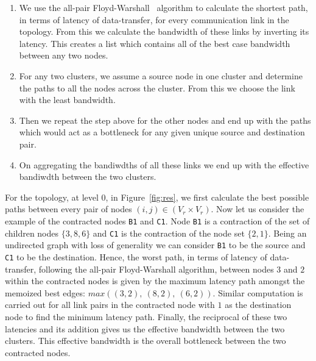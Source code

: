 \begin{itemize}
  \begin{enumerate}

  \item We use the all-pair Floyd-Warshall~\cite{sski08} algorithm to calculate
  the shortest path, in terms of latency of data-transfer, for every
  communication link in the topology. From this we calculate the bandwidth of
  these links by inverting its latency. This creates a list which contains all
  of the best case bandwidth between any two nodes.

  \item For any two clusters, we assume a source node in one cluster and
  determine the paths to all the nodes across the cluster. From this we choose
  the link with the least bandwidth.

  \item Then we repeat the step above for the other nodes and end up with the
  paths which would act as a bottleneck for any given unique source and
  destination pair.

  \item On aggregating the bandiwdths of all these links we end up with the
  effective bandiwdth between the two clusters.

  \end{enumerate}


  For the topology, at level 0, in Figure~\ref{fig:res}, we first
  calculate the best possible paths between every pair of nodes
  \mbox{$(i,j) \in (V_r \times V_r)$}. Now let us consider the example
  of the contracted nodes \texttt{B1} and \texttt{C1}. Node \texttt{B1}
  is a contraction of the set of children nodes $\{3, 8, 6\}$ and
  \texttt{C1} is the contraction of the node set $\{2, 1\}$. Being an
  undirected graph with loss of generality we can consider \texttt{B1}
  to be the source and \texttt{C1} to be the destination. Hence, the
  worst path, in terms of latency of data-transfer, following the
  all-pair Floyd-Warshall algorithm, between nodes $3$ and $2$ within
  the contracted nodes is given by the maximum latency path amongst the
  memoized best edges: $max((3,2),\ (8,2),\ (6,2))$. Similar computation
  is carried out for all link pairs in the contracted node with $1$ as
  the destination node to find the minimum latency path. Finally, the
  reciprocal of these two latencies and its addition gives us the
  effective bandwidth between the two clusters. This effective
  bandwidth is the overall bottleneck between the two contracted nodes.


\end{itemize}
